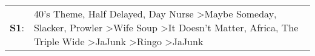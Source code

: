\begin{supertabular}{p{0.03\textwidth}p{0.92\textwidth}}
 \textbf{S1}:  &  40's Theme\textsuperscript{}, \enspace Half Delayed\textsuperscript{}, \enspace Day Nurse\textsuperscript{} \textgreater \enspace Maybe Someday\textsuperscript{}, \enspace Slacker\textsuperscript{}, \enspace Prowler\textsuperscript{} \textgreater \enspace Wife Soup\textsuperscript{} \textgreater \enspace It Doesn't Matter\textsuperscript{}, \enspace Africa\textsuperscript{}, \enspace The Triple Wide\textsuperscript{} \textgreater \enspace JaJunk\textsuperscript{} \textgreater \enspace Ringo\textsuperscript{} \textgreater \enspace JaJunk\textsuperscript{}  \enspace  \\
\end{supertabular}
